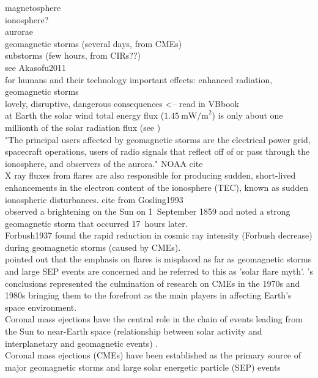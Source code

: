 magnetosphere\\
ionosphere?\\
aurorae\\
geomagnetic storms (several days, from CMEs)\\
substorms (few hours, from CIRs??)\\

see Akasofu2011\\

for humans and their technology important effects: enhanced radiation, geomagnetic storms\\
lovely, disruptive, dangerous consequences <-- read in VBbook\\

at Earth the solar wind total energy flux ($1.45~\text{mW/m}^2$) is only about one millionth of the solar radiation flux (see \citet[p.~153]{Schwenn1990})\\

"The principal users affected by geomagnetic storms are the electrical power grid, spacecraft operations, users of radio signals that reflect off of or pass through the ionosphere, and observers of the aurora." NOAA cite\\

X ray fluxes from flares are also responsible for producing sudden, short-lived enhancements in the electron content of the ionosphere (TEC), known as sudden ionospheric disturbances. cite from Gosling1993\\

\citet{Carrington1859} observed a brightening on the Sun on 1~September 1859 and noted a strong geomagnetic storm that occurred 17~hours later.\\

Forbush1937 found the rapid reduction in cosmic ray intensity (Forbush decrease) during geomagnetic storms (caused by CMEs).\\

\citet{Gosling1993} pointed out that the emphasis on flares is misplaced as far as geomagnetic storms and large SEP events are concerned and he referred to this as 'solar flare myth'. \citet{Gosling1993}'s conclusions represented the culmination of research on CMEs in the 1970s and 1980s bringing them to the forefront as the main players in affecting Earth’s space environment.\\
Coronal mass ejections have the central role in the chain of events leading from the Sun to near-Earth space (relationship between solar activity and interplanetary and geomagnetic events) \citep{Gosling1993}.\\
Coronal mass ejections (CMEs) have been established as the primary source of major geomagnetic storms
and large solar energetic particle (SEP) events \citep{Gosling1993}\\

